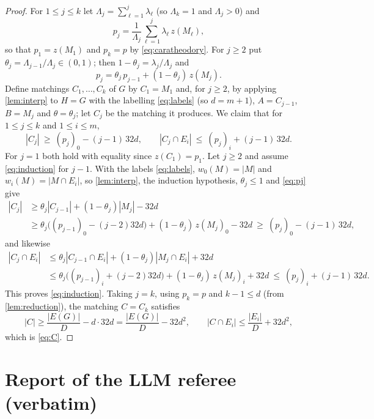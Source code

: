 \documentclass[11pt,a4paper]{article}
\theoremstyle{plain}
\theoremstyle{definition}
\theoremstyle{remark}
\begin{document}
\label{pf:iterate}
\lemiterate*
\begin{proof}
For $1\le j\le k$ let $\Lambda_j=\sum_{\ell=1}^j\lambda_\ell$ (so $\Lambda_k=1$ and $\Lambda_j>0$) and
\[
 p_j=\frac1{\Lambda_j}\sum_{\ell=1}^j\lambda_\ell\,z(M_\ell),
\]
so that $p_1=z(M_1)$ and $p_k=p$ by \eqref{eq:caratheodory}. For $j\ge2$ put $\theta_j=\Lambda_{j-1}/\Lambda_j\in(0,1)$; then $1-\theta_j=\lambda_j/\Lambda_j$ and
\begin{equation}\label{eq:pj}
 p_j=\theta_j\,p_{j-1}+(1-\theta_j)\,z(M_j).
\end{equation}
Define matchings $C_1,\dots,C_k$ of $G$ by $C_1=M_1$ and, for $j\ge2$, by applying \cref{lem:interp} to $H=G$ with the labelling \eqref{eq:labels} (so $d=m+1$), $A=C_{j-1}$, $B=M_j$ and $\theta=\theta_j$; let $C_j$ be the matching it produces. We claim that for $1\le j\le k$ and $1\le i\le m$,
\begin{equation}\label{eq:induction}
 |C_j|\ \ge\ (p_j)_0-(j-1)\,32d,\qquad |C_j\cap E_i|\ \le\ (p_j)_i+(j-1)\,32d .
\end{equation}
For $j=1$ both hold with equality since $z(C_1)=p_1$. Let $j\ge2$ and assume \eqref{eq:induction} for $j-1$. With the labels \eqref{eq:labels}, $w_0(M)=|M|$ and $w_i(M)=|M\cap E_i|$, so \cref{lem:interp}, the induction hypothesis, $\theta_j\le1$ and \eqref{eq:pj} give
\begin{align*}
 |C_j|&\ge\theta_j|C_{j-1}|+(1-\theta_j)|M_j|-32d\\
 &\ge\theta_j\bigl((p_{j-1})_0-(j-2)32d\bigr)+(1-\theta_j)\,z(M_j)_0-32d
 \ \ge\ (p_j)_0-(j-1)\,32d,
\end{align*}
and likewise
\begin{align*}
 |C_j\cap E_i|&\le\theta_j|C_{j-1}\cap E_i|+(1-\theta_j)|M_j\cap E_i|+32d\\
 &\le\theta_j\bigl((p_{j-1})_i+(j-2)32d\bigr)+(1-\theta_j)\,z(M_j)_i+32d
 \ \le\ (p_j)_i+(j-1)\,32d .
\end{align*}
This proves \eqref{eq:induction}. Taking $j=k$, using $p_k=p$ and $k-1\le d$ (from \cref{lem:reduction}), the matching $C=C_k$ satisfies
\[
 |C|\ge\frac{|E(G)|}{D}-d\cdot32d=\frac{|E(G)|}{D}-32d^2,\qquad
 |C\cap E_i|\le\frac{|E_i|}{D}+32d^2 ,
\]
which is \eqref{eq:C}.
\end{proof}

\section{Report of the LLM referee (verbatim)}\label{app:referee}
\end{document}
